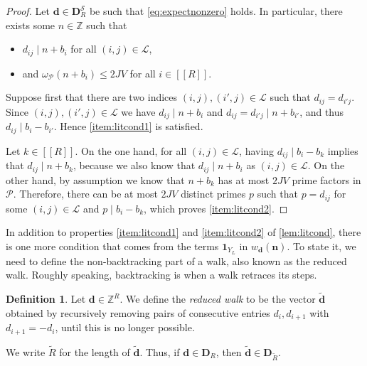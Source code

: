\documentclass[11pt]{amsart}
\theoremstyle{definition}
\newtheorem{definition}[theorem]{Definition}
\renewcommand{\leq}{\leqslant}
\newcommand{\sinterval}[1]{[\![#1]\!] }
\newcommand{\ind}[1]{\mathbf{1}_{#1}}
\newcommand{\Z}{\mathbb{Z}}
\newcommand{\primes}{\mathcal{P}}
\renewcommand{\d}{\boldsymbol{d}}
\newcommand{\pcomp}[2]{d_{#1#2}}
\newcommand{\n}{\mathbf{n}}
\newcommand{\curlyL}{V}
\newcommand{\sommespart}{b}
\newcommand{\lit}{\mathcal{L}}
\newcommand{\s}{\mathcal{S}}
\newcommand{\fancyD}{\mathbf{D}}
\newcommand{\Dsfmix}[1]{\fancyD_{\!#1}}
\newcommand{\DsfR}{\fancyD_{\!\tupsize}}
\newcommand{\DsR}{\fancyD^{\s}_{\!\tupsize}}
\newcommand{\elln}{L}
\newcommand{\Y}{Y_{\!\elln}}
\newcommand{\repR}{J}
\newcommand{\Redd}{\widetilde{\d}}
\newcommand{\tupsize}{R}
\begin{document}
\begin{proof}
Let $\d\in \DsR$ be such that \cref{eq:expectnonzero} holds. In particular, there exists some $n\in \Z$ such that 
\begin{itemize}
	\item $\pcomp{i}{j}\mid n+\sommespart_i$ for all $(i,j)\in \lit$,
	\item and $\omega_{\primes}(n+\sommespart_i)\leq 2\repR\curlyL$ for all $i\in \sinterval{\tupsize}$.
\end{itemize}

Suppose first that there are two indices $(i,j), (i', j)\in \lit$ such that $\pcomp{i}{j} = \pcomp{i'}{j}$. Since $(i,j), (i', j)\in \lit$ we have $\pcomp{i}{j} \mid n+\sommespart_i$ and $\pcomp{i}{j} = \pcomp{i'}{j} \mid n+\sommespart_{i'}$, and thus $\pcomp{i}{j} \mid \sommespart_i - \sommespart_{i'}$. Hence \cref{item:litcond1} is satisfied.

Let $k\in \sinterval{\tupsize}$. On the one hand, for all $(i,j)\in \lit$, having $\pcomp{i}{j}\mid \sommespart_i-\sommespart_k$ implies that $\pcomp{i}{j} \mid n+\sommespart_k$, because we also know that $\pcomp{i}{j}\mid n+\sommespart_i$ as $(i,j)\in \lit$. On the other hand, by assumption we know that $n+\sommespart_k$ has at most $2\repR\curlyL$ prime factors in $\primes$. Therefore, there can be at most $2\repR\curlyL$ distinct primes $p$ such that $p = \pcomp{i}{j}$ for some $(i,j)\in \lit$ and $p \mid \sommespart_i - \sommespart_k$, which proves \cref{item:litcond2}.
\end{proof}

In addition to properties \cref{item:litcond1} and \cref{item:litcond2} of \cref{lem:litcond}, there is one more condition that comes from the terms $\ind{\Y}$ in $w_{\d}(\n)$. To state it, we need to define the non-backtracking part of a walk, also known as the reduced walk. Roughly speaking, backtracking is when a walk retraces its steps.

\begin{definition}
\label{def:backtracking}
Let $\d \in \Z^{\tupsize}$. We define the \emph{reduced walk} to be the vector $\Redd$ obtained by recursively removing pairs of consecutive entries $d_i, d_{i+1}$ with $d_{i+1} = -d_i$, until this is no longer possible. 

We write $\widetilde{\tupsize}$ for the length of $\Redd$. Thus, if $\d \in \DsfR$, then $\Redd \in \Dsfmix{\widetilde{\tupsize}}$.
\end{definition}
\end{document}
